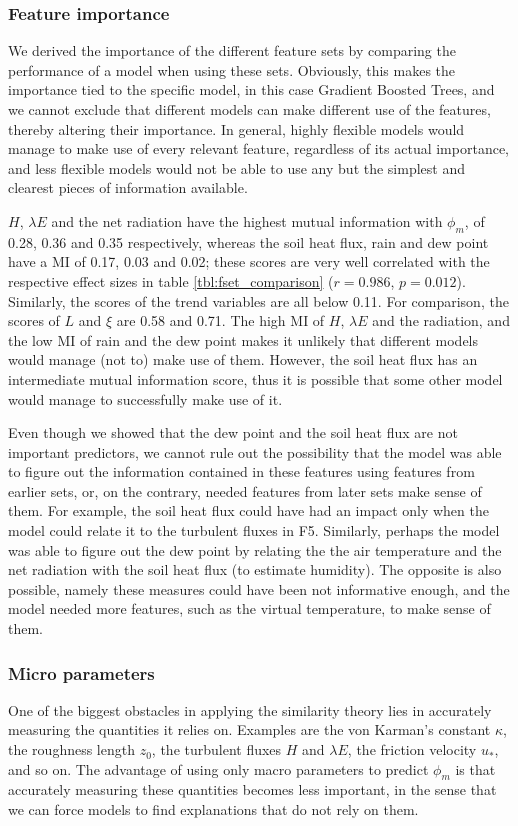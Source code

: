 \documentclass[a4paper,11pt]{kth-mag}
\begin{document}
\subsubsection{Feature importance}
We derived the importance of the different feature sets by comparing the performance of a model when using these sets. Obviously, this makes the importance tied to the specific model, in this case Gradient Boosted Trees, and we cannot exclude that different models can make different use of the features, thereby altering their importance. In general, highly flexible models would manage to make use of every relevant feature, regardless of its actual importance, and less flexible models would not be able to use any but the simplest and clearest pieces of information available.

$H$, $\lambda E$ and the net radiation have the highest mutual information with $\phi_m$, of 0.28, 0.36 and 0.35 respectively, whereas the soil heat flux, rain and dew point have a MI of 0.17, 0.03 and 0.02; these scores are very well correlated with the respective effect sizes in table \ref{tbl:fset_comparison} ($r=0.986$, $p=0.012$). Similarly, the scores of the trend variables are all below 0.11. For comparison, the scores of $L$ and $\xi$ are 0.58 and 0.71. The high MI of $H$, $\lambda E$ and the radiation, and the low MI of rain and the dew point makes it unlikely that different models would manage (not to) make use of them. However, the soil heat flux has an intermediate mutual information score, thus it is possible that some other model would manage to successfully make use of it.

Even though we showed that the dew point and the soil heat flux are not important predictors, we cannot rule out the possibility that the model was able to figure out the information contained in these features using features from earlier sets, or, on the contrary, needed features from later sets make sense of them. For example, the soil heat flux could have had an impact only when the model could relate it to the turbulent fluxes in F5. Similarly, perhaps the model was able to figure out the dew point by relating the the air temperature and the net radiation with the soil heat flux (to estimate humidity). The opposite is also possible, namely these measures could have been not informative enough, and the model needed more features, such as the virtual temperature, to make sense of them.

\subsubsection{Micro parameters} One of the biggest obstacles in applying the similarity theory lies in accurately measuring the quantities it relies on. Examples are the von Karman's constant $\kappa$, the roughness length $z_0$, the turbulent fluxes $H$ and $\lambda E$, the friction velocity $u_*$, and so on. The advantage of using only macro parameters to predict $\phi_m$ is that accurately measuring these quantities becomes less important, in the sense that we can force models to find explanations that do not rely on them.
\end{document}
